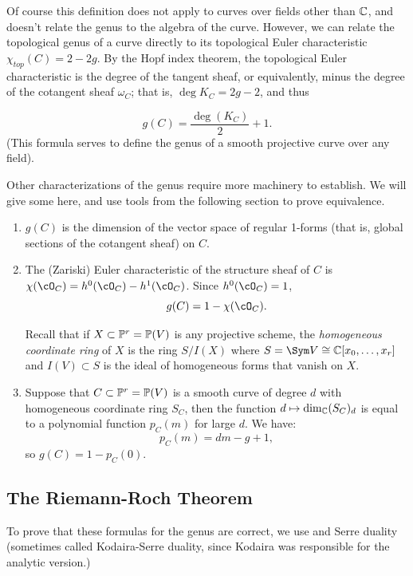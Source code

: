 Of course this definition does not apply to curves over fields other than $\CC$, and doesn't relate the genus to the algebra of the curve. However, we can relate the topological genus of a curve directly to its topological Euler characteristic
$
\chi_{top}(C) = 2-2g.
$
By the Hopf index theorem, the topological Euler characteristic is the degree of the tangent sheaf, or equivalently, minus the degree of the cotangent sheaf $\omega_{C}$; that is, $\deg K_{C} = 2g-2$, and thus

$$
g(C) = \frac{\deg(K_C)}{2} + 1.
$$
(This formula serves to define the genus of a smooth projective curve over any field).

Other characterizations of the genus require more machinery to establish. We will give some here, and use  tools from the following section to prove equivalence.

\begin{enumerate}

\item\label{genus 1forms} $g(C)$ is the dimension of the vector space of regular 1-forms (that is, global sections of the
cotangent sheaf) on $C$.

\item The (Zariski) Euler characteristic of the structure sheaf of $C$ is $\chi(\cO_C) = h^0(\cO_C) - h^1(\cO_C)$. Since $h^0(\cO_C) = 1$, 
$$
g(C) = 1 - \chi(\cO_C).
$$

Recall that if $X\subset \PP^{r} = \PP(V)$ is any projective scheme, the \emph{homogeneous coordinate ring} of $X$
is the ring $S/I(X)$ where $S = \Sym V \cong \CC[x_{0}, \dots, x_{r}]$ and $I(V)\subset S$ is the ideal of homogeneous
forms that vanish on $X$.

\item\label{genus Hilbert} Suppose that $C \subset \PP^r = \PP(V)$ is a smooth curve of degree $d$  with homogeneous coordinate ring
$S_C$, then the function $d \mapsto \dim_\CC (S_C)_d$ is equal to a polynomial function $p_C(m)$ for large $d$. We have:
$$
p_C(m) =  dm - g + 1,
$$
so $g(C) = 1 - p_C(0)$. 
\end{enumerate}

\subsection{The Riemann-Roch Theorem}

To prove that these formulas for the genus are correct, we use \trr and Serre duality (sometimes called Kodaira-Serre duality, since Kodaira was responsible for the analytic version.)

